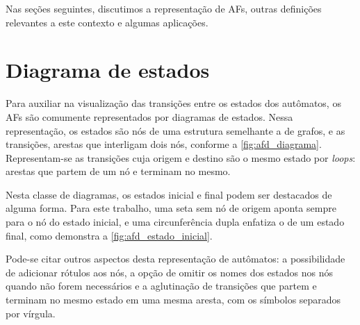 Nas seções seguintes, discutimos a representação de AFs, outras definições relevantes a este contexto e algumas aplicações.

\section{Diagrama de estados}

Para auxiliar na visualização das transições entre os estados dos autômatos, os AFs são comumente representados por diagramas de estados. Nessa representação, os estados são nós de uma estrutura semelhante a de grafos, e as transições, arestas que interligam dois nós, conforme a \autoref{fig:afd_diagrama}. Representam-se as transições cuja origem e destino são o mesmo estado por \textit{loops}: arestas que partem de um nó e terminam no mesmo.


Nesta classe de diagramas, os estados inicial e final podem ser destacados de alguma forma. Para este trabalho, uma seta sem nó de origem aponta sempre para o nó do estado inicial, e uma circunferência dupla enfatiza o de um estado final, como demonstra a \autoref{fig:afd_estado_inicial}.


Pode-se citar outros aspectos desta representação de autômatos: a possibilidade de adicionar rótulos aos nós, a opção de omitir os nomes dos estados nos nós quando não forem necessários e a aglutinação de transições que partem e terminam no mesmo estado em uma mesma aresta, com os símbolos separados por vírgula.

